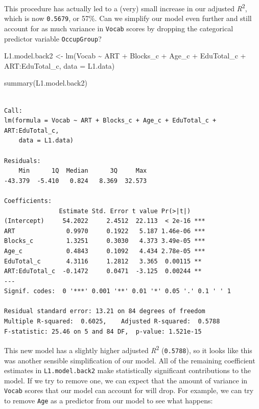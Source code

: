 \documentclass[
  letterpaper,
  DIV=11,
  numbers=noendperiod]{scrreprt}
\newenvironment{Shaded}{\begin{snugshade}}{\end{snugshade}}
\newcommand{\AttributeTok}[1]{\textcolor[rgb]{0.40,0.45,0.13}{#1}}
\newcommand{\FunctionTok}[1]{\textcolor[rgb]{0.28,0.35,0.67}{#1}}
\newcommand{\NormalTok}[1]{\textcolor[rgb]{0.00,0.23,0.31}{#1}}
\newcommand{\OtherTok}[1]{\textcolor[rgb]{0.00,0.23,0.31}{#1}}
\newcommand{\SpecialCharTok}[1]{\textcolor[rgb]{0.37,0.37,0.37}{#1}}
\begin{document}
This procedure has actually led to a (very) small increase in our
adjusted \emph{R}\textsuperscript{2}, which is now \texttt{0.5679}, or
57\%. Can we simplify our model even further and still account for as
much variance in \texttt{Vocab} scores by dropping the categorical
predictor variable \texttt{OccupGroup}?

\begin{Shaded}
\begin{Highlighting}[]
\NormalTok{L1.model.back2 }\OtherTok{\textless{}{-}}  \FunctionTok{lm}\NormalTok{(Vocab }\SpecialCharTok{\textasciitilde{}}\NormalTok{ ART }\SpecialCharTok{+}\NormalTok{ Blocks\_c }\SpecialCharTok{+}\NormalTok{ Age\_c }\SpecialCharTok{+}\NormalTok{ EduTotal\_c }\SpecialCharTok{+}\NormalTok{ ART}\SpecialCharTok{:}\NormalTok{EduTotal\_c, }
           \AttributeTok{data =}\NormalTok{ L1.data)}

\FunctionTok{summary}\NormalTok{(L1.model.back2)}
\end{Highlighting}
\end{Shaded}

\begin{verbatim}

Call:
lm(formula = Vocab ~ ART + Blocks_c + Age_c + EduTotal_c + ART:EduTotal_c, 
    data = L1.data)

Residuals:
    Min      1Q  Median      3Q     Max 
-43.379  -5.410   0.824   8.369  32.573 

Coefficients:
               Estimate Std. Error t value Pr(>|t|)    
(Intercept)     54.2022     2.4512  22.113  < 2e-16 ***
ART              0.9970     0.1922   5.187 1.46e-06 ***
Blocks_c         1.3251     0.3030   4.373 3.49e-05 ***
Age_c            0.4843     0.1092   4.434 2.78e-05 ***
EduTotal_c       4.3116     1.2812   3.365  0.00115 ** 
ART:EduTotal_c  -0.1472     0.0471  -3.125  0.00244 ** 
---
Signif. codes:  0 '***' 0.001 '**' 0.01 '*' 0.05 '.' 0.1 ' ' 1

Residual standard error: 13.21 on 84 degrees of freedom
Multiple R-squared:  0.6025,    Adjusted R-squared:  0.5788 
F-statistic: 25.46 on 5 and 84 DF,  p-value: 1.521e-15
\end{verbatim}

This new model has a slightly higher adjusted
\emph{R}\textsuperscript{2} (\texttt{0.5788}), so it looks like this was
another sensible simplification of our model. All of the remaining
coefficient estimates in \texttt{L1.model.back2} make statistically
significant contributions to the model. If we try to remove one, we can
expect that the amount of variance in \texttt{Vocab} scores that our
model can account for will drop. For example, we can try to remove
\texttt{Age} as a predictor from our model to see what happens:
\end{document}

